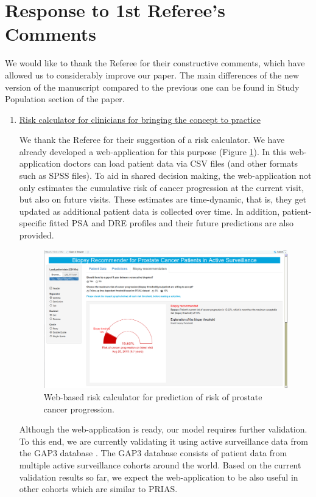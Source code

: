 		\clearpage
		\section*{Response to 1st Referee's Comments}
		We would like to thank the Referee for their constructive comments, which have allowed us to considerably improve our paper. The main differences of the new version of the manuscript compared to the previous one can be found in Study Population section of the paper.

		\begin{enumerate}

		    \item \underline{Risk calculator for clinicians for bringing the concept to practice}

		    We thank the Referee for their suggestion of a risk calculator. We have already developed a web-application for this purpose (Figure \ref{fig:webapp}). In this web-application doctors can load patient data via CSV files (and other formats such as SPSS files). To aid in shared decision making, the web-application not only estimates the cumulative risk of cancer progression at the current visit, but also on future visits. These estimates are time-dynamic, that is, they get updated as additional patient data is collected over time. In addition, patient-specific fitted PSA and DRE profiles and their future predictions are also provided. 

		    \begin{figure}[!htb]
	    		\centerline{\includegraphics[width=0.8\columnwidth]{../images/webapp.png}}
				\caption{Web-based risk calculator for prediction of risk of prostate cancer progression.}
				\label{fig:webapp}
			\end{figure}

			Although the web-application is ready, our model requires further validation. To this end, we are currently validating it using active surveillance data from the GAP3 database \citep{bruinsma2018movember}. The GAP3 database consists of patient data from multiple active surveillance cohorts around the world. Based on the current validation results so far, we expect the web-application to be also useful in other cohorts which are similar to PRIAS.


\end{enumerate}
